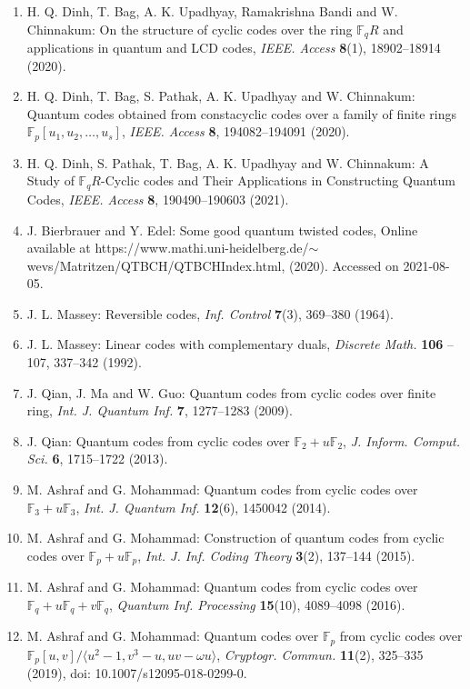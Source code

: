\documentclass[12pt]{article}
\begin{document}
\begin{enumerate}
\item H. Q. Dinh, T. Bag, A. K. Upadhyay, Ramakrishna Bandi and W. Chinnakum: On the structure of cyclic codes over the ring $\mathbb{F}_qR$ and applications in quantum and LCD codes, \textit{IEEE. Access} \textbf{8}(1), 18902--18914 (2020).
\item H. Q. Dinh, T. Bag, S. Pathak, A. K. Upadhyay and W. Chinnakum: Quantum codes obtained from constacyclic codes over a family of finite rings $\mathbb{F}_p[u_1, u_2, \dots, u_s]$, \textit{IEEE. Access} \textbf{8}, 194082--194091 (2020).
\item H. Q. Dinh, S. Pathak, T. Bag, A. K. Upadhyay and W. Chinnakum: A Study of $\mathbb{F}_qR$-Cyclic codes and Their Applications in Constructing Quantum Codes, \textit{IEEE. Access} \textbf{8}, 190490--190603 (2021).
\item J. Bierbrauer and Y. Edel: Some good quantum twisted codes, Online available at https://www.mathi.uni-heidelberg.de/$\sim$wevs/Matritzen/QTBCH/QTBCHIndex.html, (2020). Accessed on 2021-08-05.
\item J. L. Massey: Reversible codes, \textit{Inf. Control} \textbf{7}(3), 369--380 (1964).
\item J. L. Massey: Linear codes with complementary duals, \textit{Discrete Math.} \textbf{106} -- 107, 337--342 (1992).
\item J. Qian, J. Ma and W. Guo: Quantum codes from cyclic codes over finite ring, \textit{Int. J. Quantum Inf.} \textbf{7}, 1277--1283 (2009).
\item J. Qian: Quantum codes from cyclic codes over $\mathbb{F}_2 + u\mathbb{F}_2$, \textit{J. Inform. Comput. Sci.} \textbf{6}, 1715--1722 (2013).
\item M. Ashraf and G. Mohammad: Quantum codes from cyclic codes over $\mathbb{F}_3 + u\mathbb{F}_3$, \textit{Int. J. Quantum Inf.} \textbf{12}(6), 1450042 (2014).
\item M. Ashraf and G. Mohammad: Construction of quantum codes from cyclic codes over $\mathbb{F}_p + u\mathbb{F}_p$, \textit{Int. J. Inf. Coding Theory} \textbf{3}(2), 137--144 (2015).
\item M. Ashraf and G. Mohammad: Quantum codes from cyclic codes over $\mathbb{F}_q + u\mathbb{F}_q + v\mathbb{F}_q$, \textit{Quantum Inf. Processing} \textbf{15}(10), 4089--4098 (2016).
\item M. Ashraf and G. Mohammad: Quantum codes over $\mathbb{F}_p$ from cyclic codes over $\mathbb{F}_p[u,v]/\langle u^2 - 1, v^3 - u, uv - \omega u \rangle$, \textit{Cryptogr. Commun.} \textbf{11}(2), 325--335 (2019), doi: 10.1007/s12095-018-0299-0.

\end{enumerate}
\end{document}
